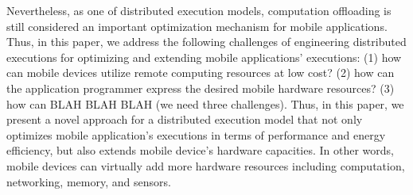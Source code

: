 \documentclass[conference]{IEEEtran}
\begin{document}
Nevertheless, as one of distributed execution models, computation offloading is still considered an important optimization mechanism for mobile applications. Thus, in this paper, we address the following challenges of engineering distributed executions for optimizing and extending mobile applications' executions: (1) how can mobile devices utilize remote computing resources at low cost? (2) how can the application programmer express the desired mobile hardware resources? (3) how can BLAH BLAH BLAH (we need three challenges). Thus, in this paper, we present a novel approach for a distributed execution model that not only optimizes mobile application's executions in terms of performance and energy efficiency, but also extends mobile device's hardware capacities. In other words, mobile devices can virtually add more hardware resources including computation, networking, memory, and sensors.



\end{document}
